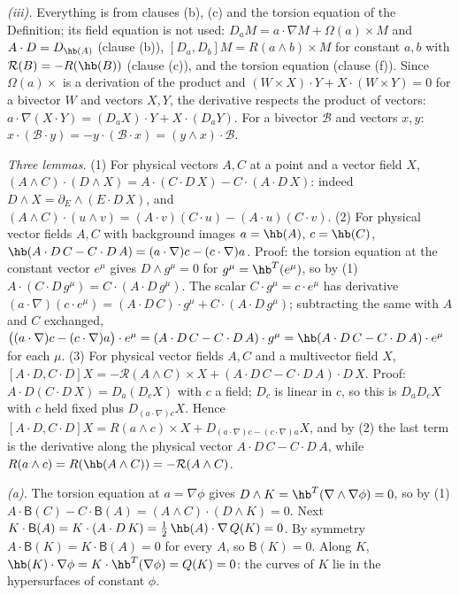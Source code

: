 \emph{(iii).} Everything is from clauses (b), (c) and the torsion equation of the Definition; its field equation is not used: $D_{a}M = a \cdot \nabla M + \Omega(a) \times M$ and $A \cdot D = D_{\hb(A)}$ (clause (b)), $[D_{a}, D_{b}]M = R(a \wedge b) \times M$ for constant $a, b$ with $\mathcal{R}(B) = -R(\hb(B))$ (clause (c)), and the torsion equation (clause (f)). Since $\Omega(a) \times$ is a derivation of the product and $(W \times X) \cdot Y + X \cdot (W \times Y) = 0$ for a bivector $W$ and vectors $X, Y$, the derivative respects the product of vectors: $a \cdot \nabla(X \cdot Y) = (D_{a}X) \cdot Y + X \cdot (D_{a}Y)$. For a bivector $\mathcal{B}$ and vectors $x, y$: $x \cdot (\mathcal{B} \cdot y) = -y \cdot (\mathcal{B} \cdot x) = (y \wedge x) \cdot \mathcal{B}$.

\emph{Three lemmas.} (1) For physical vectors $A, C$ at a point and a vector field $X$, $(A \wedge C) \cdot (D \wedge X) = A \cdot (C \cdot D\,X) - C \cdot (A \cdot D\,X)$: indeed $D \wedge X = \partial_{E} \wedge (E \cdot D\,X)$, and $(A \wedge C) \cdot (u \wedge v) = (A \cdot v)(C \cdot u) - (A \cdot u)(C \cdot v)$. (2) For physical vector fields $A, C$ with background images $a = \hb(A)$, $c = \hb(C)$, $\hb(A \cdot D\,C - C \cdot D\,A) = (a \cdot \nabla)c - (c \cdot \nabla)a$. Proof: the torsion equation at the constant vector $e^{\mu}$ gives $D \wedge g^{\mu} = 0$ for $g^{\mu} = \hb^{T}(e^{\mu})$, so by (1) $A \cdot (C \cdot D\,g^{\mu}) = C \cdot (A \cdot D\,g^{\mu})$. The scalar $C \cdot g^{\mu} = c \cdot e^{\mu}$ has derivative $(a \cdot \nabla)(c \cdot e^{\mu}) = (A \cdot D\,C) \cdot g^{\mu} + C \cdot (A \cdot D\,g^{\mu})$; subtracting the same with $A$ and $C$ exchanged, $\bigl((a \cdot \nabla)c - (c \cdot \nabla)a\bigr) \cdot e^{\mu} = (A \cdot D\,C - C \cdot D\,A) \cdot g^{\mu} = \hb(A \cdot D\,C - C \cdot D\,A) \cdot e^{\mu}$ for each $\mu$. (3) For physical vector fields $A, C$ and a multivector field $X$, $[A \cdot D, C \cdot D]X = -\mathcal{R}(A \wedge C) \times X + (A \cdot D\,C - C \cdot D\,A) \cdot D\,X$. Proof: $A \cdot D(C \cdot D\,X) = D_{a}(D_{c}X)$ with $c$ a field; $D_{c}$ is linear in $c$, so this is $D_{a}D_{c}X$ with $c$ held fixed plus $D_{(a \cdot \nabla)c}X$. Hence $[A \cdot D, C \cdot D]X = R(a \wedge c) \times X + D_{(a \cdot \nabla)c - (c \cdot \nabla)a}X$, and by (2) the last term is the derivative along the physical vector $A \cdot D\,C - C \cdot D\,A$, while $R(a \wedge c) = R(\hb(A \wedge C)) = -\mathcal{R}(A \wedge C)$.

\emph{(a).} The torsion equation at $a = \nabla\phi$ gives $D \wedge K = \hb^{T}(\nabla \wedge \nabla\phi) = 0$, so by (1) $A \cdot \mathsf{B}(C) - C \cdot \mathsf{B}(A) = (A \wedge C) \cdot (D \wedge K) = 0$. Next $K \cdot \mathsf{B}(A) = K \cdot (A \cdot D\,K) = \tfrac12\,\hb(A) \cdot \nabla\,Q(K) = 0$. By symmetry $A \cdot \mathsf{B}(K) = K \cdot \mathsf{B}(A) = 0$ for every $A$, so $\mathsf{B}(K) = 0$. Along $K$, $\hb(K) \cdot \nabla\phi = K \cdot \hb^{T}(\nabla\phi) = Q(K) = 0$: the curves of $K$ lie in the hypersurfaces of constant $\phi$.

